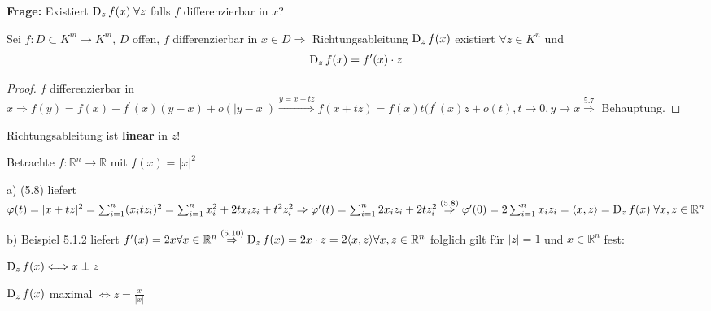 \textbf{Frage:} Existiert $\operatorname{D}_z f(x)\; \forall z$ falls $f$ differenzierbar in $x$?

\begin{satz}\label{satz:Richtungsableitung_linear}
    Sei $f : D \subset K^m \to K^m$, $D$ offen, $f$ differenzierbar in $x \in D \Rightarrow$ Richtungsableitung $\operatorname{D}_z f(x)$ existiert $\forall z \in K^n$ und 
    \begin{align}
    \operatorname{D}_z f(x) = f^{\prime}(x)\cdot z
    \end{align}    
\end{satz}

\begin{proof}
    $f$ differenzierbar in $x \Rightarrow f(y) = f(x) + f^{\prime}(x)(y-x) + o(\vert y-x\vert) \overset{y=x+tz}{\Rightarrow} f(x+tz) = f(x) t(f^{\prime}(x)z + o(t), t \to 0, y \to x \overset{5.7}{\Rightarrow}$ Behauptung.
\end{proof}

\begin{bemerkung}
	Richtungsableitung ist \textbf{linear} in $z$!
\end{bemerkung}

\begin{beispiel}
    Betrachte $f: \mathbb{R}^n \to \mathbb{R}$ mit $f(x) = \vert x \vert^2$
    \begin{compactitem}%
        \item[a)] (5.8) liefert $\varphi(t) = \vert x + tz\vert^2 = \sum_{i=1}^{n} (x_i t z_i)^2 = \sum_{i=1}^{n} x_i^2 + 2t x_i z_i + t^2 z_i^2 \Rightarrow \varphi^{\prime}(t) = \sum_{i=1}^{n} 2x_i z_i + 2t z_i^2 \overset{(5.8)}{\Rightarrow} \varphi^{\prime}(0) = 2 \sum_{i=1}^{n} x_i z_i = \langle x,z \rangle = \operatorname{D}_z  f(x)\; \forall x,z \in \mathbb{R}^n$
        \item[b)] Beispiel 5.1.2 liefert $f^{\prime}(x) = 2x \forall x \in \mathbb{R}^n \overset{(5.10)}{\Rightarrow} \operatorname{D}_z f(x) = 2x \cdot z = 2 \langle x,z \rangle \forall x,z \in \mathbb{R}^n$ folglich gilt für $\vert z \vert = 1$ und $x \in \mathbb{R}^n$ fest:
        \begin{compactitem}[\textbullet]
            \item $\operatorname{D}_z f(x) \Longleftrightarrow x \perp z$
            \item $\operatorname{D}_z f(x)$ maximal $\Longleftrightarrow z = \frac{x}{\vert x \vert}$
        \end{compactitem}
    \end{compactitem}
\end{beispiel}

